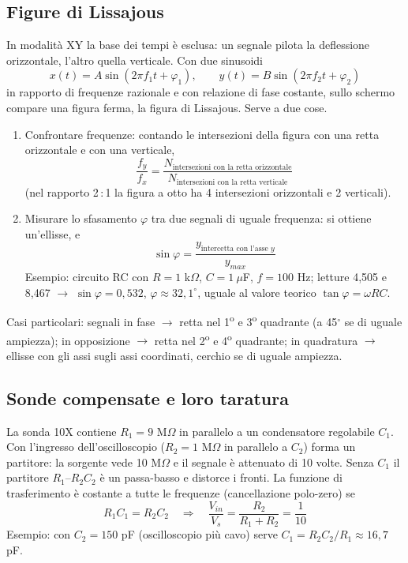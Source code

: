 \documentclass[11pt,a4paper]{article}
\begin{document}
\subsection*{Figure di Lissajous}

In modalità XY la base dei tempi è esclusa: un segnale pilota la deflessione orizzontale, l'altro quella verticale. Con due sinusoidi
\[
x(t) = A\sin(2\pi f_1 t + \varphi_1), \qquad y(t) = B\sin(2\pi f_2 t + \varphi_2)
\]
in rapporto di frequenze razionale e con relazione di fase costante, sullo schermo compare una figura ferma, la figura di Lissajous. Serve a due cose.
\begin{enumerate}
\item Confrontare frequenze: contando le intersezioni della figura con una retta orizzontale e con una verticale,
\[
\frac{f_y}{f_x} = \frac{N_{\text{intersezioni con la retta orizzontale}}}{N_{\text{intersezioni con la retta verticale}}}
\]
(nel rapporto 2\,:\,1 la figura a otto ha 4 intersezioni orizzontali e 2 verticali).
\item Misurare lo sfasamento $\varphi$ tra due segnali di uguale frequenza: si ottiene un'ellisse, e
\[
\sin\varphi = \frac{y_{\text{intercetta con l'asse }y}}{y_{max}}
\]
Esempio: circuito RC con $R = 1$ k$\Omega$, $C = 1\ \mu$F, $f = 100$ Hz; letture 4,505 e 8,467 $\rightarrow$ $\sin\varphi = 0{,}532$, $\varphi \approx 32{,}1^\circ$, uguale al valore teorico $\tan\varphi = \omega RC$.
\end{enumerate}
Casi particolari: segnali in fase $\rightarrow$ retta nel 1\textsuperscript{o} e 3\textsuperscript{o} quadrante (a 45$^\circ$ se di uguale ampiezza); in opposizione $\rightarrow$ retta nel 2\textsuperscript{o} e 4\textsuperscript{o} quadrante; in quadratura $\rightarrow$ ellisse con gli assi sugli assi coordinati, cerchio se di uguale ampiezza.

\subsection*{Sonde compensate e loro taratura}

La sonda 10X contiene $R_1 = 9$ M$\Omega$ in parallelo a un condensatore regolabile $C_1$. Con l'ingresso dell'oscilloscopio ($R_2 = 1$ M$\Omega$ in parallelo a $C_2$) forma un partitore: la sorgente vede 10 M$\Omega$ e il segnale è attenuato di 10 volte. Senza $C_1$ il partitore $R_1$--$R_2C_2$ è un passa-basso e distorce i fronti. La funzione di trasferimento è costante a tutte le frequenze (cancellazione polo-zero) se
\[
R_1 C_1 = R_2 C_2 \quad\Rightarrow\quad \frac{V_{in}}{V_s} = \frac{R_2}{R_1 + R_2} = \frac{1}{10}
\]
Esempio: con $C_2 = 150$ pF (oscilloscopio più cavo) serve $C_1 = R_2C_2/R_1 \approx 16{,}7$ pF.
\end{document}
